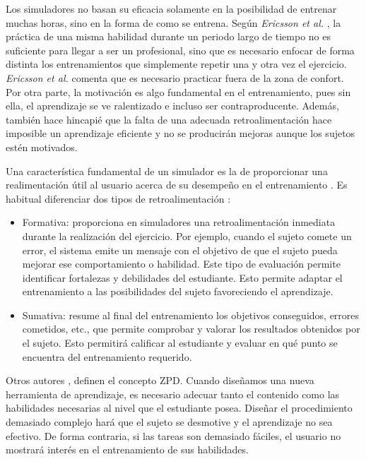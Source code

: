 Los simuladores no basan su eficacia solamente en la posibilidad de entrenar muchas horas, sino en la forma de como se entrena. Según \emph{Ericsson et al.} \cite{ericsson1993role}, la práctica de una misma habilidad durante un periodo largo de tiempo no es suficiente para llegar a ser un profesional, sino que es necesario enfocar de forma distinta los entrenamientos que simplemente repetir una y otra vez el ejercicio. \emph{Ericsson et al.} comenta que es necesario practicar fuera de la zona de confort. Por otra parte, la motivación es algo fundamental en el entrenamiento, pues sin ella, el aprendizaje se ve ralentizado e incluso ser contraproducente. Además, también hace hincapié que la falta de una adecuada retroalimentación hace imposible un aprendizaje eficiente y no se producirán mejoras aunque los sujetos estén motivados. 

Una característica fundamental de un simulador es la de proporcionar una realimentación útil al usuario acerca de su desempeño en el entrenamiento \cite{ericsson1993role}. Es habitual diferenciar dos tipos de retroalimentación \cite{Sando2013}: 
\begin{itemize}
    \item Formativa: proporciona en simuladores una retroalimentación inmediata durante la realización del ejercicio. Por ejemplo, cuando el sujeto comete un error, el sistema emite un mensaje con el objetivo de que el sujeto pueda mejorar ese comportamiento o habilidad. Este tipo de evaluación permite identificar fortalezas y debilidades del estudiante. Esto permite adaptar el entrenamiento a las posibilidades del sujeto favoreciendo el aprendizaje.
    \item Sumativa: resume al final del entrenamiento los objetivos conseguidos, errores cometidos, etc.,  que permite comprobar y valorar los resultados obtenidos por el sujeto. Esto permitirá calificar al estudiante y evaluar en qué punto se encuentra del entrenamiento requerido.
\end{itemize}


Otros autores \cite{zpd}, definen el concepto \ac{ZPD}. Cuando diseñamos una nueva herramienta de aprendizaje, es necesario adecuar tanto el contenido como las habilidades necesarias al nivel que el estudiante posea. Diseñar el procedimiento demasiado complejo hará que el sujeto se desmotive y el aprendizaje no sea efectivo. De forma contraria, si las tareas son demasiado fáciles, el usuario no mostrará interés en el entrenamiento de sus habilidades.


